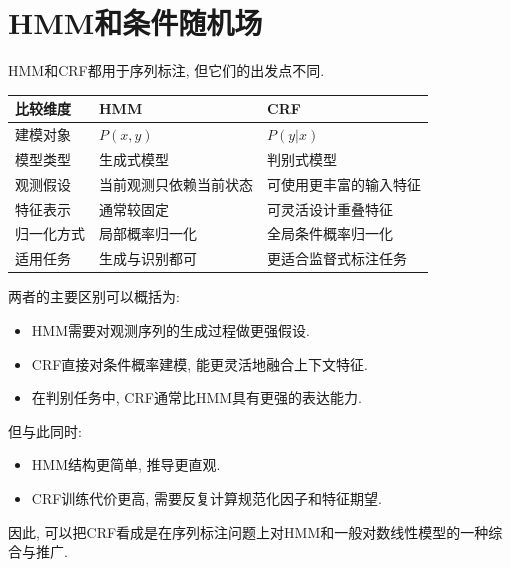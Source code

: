 \section{HMM和条件随机场}


HMM和CRF都用于序列标注, 但它们的出发点不同.

\begin{table}[H]
\centering
\begingroup
\setlength{\tabcolsep}{2pt}
\small
\begin{tabular}{|p{}|p{}|p{}|}
\hline
比较维度 & HMM & CRF \\ \hline
建模对象 & $P(x, y)$ & $P(y|x)$ \\ \hline
模型类型 & 生成式模型 & 判别式模型 \\ \hline
观测假设 & 当前观测只依赖当前状态 & 可使用更丰富的输入特征 \\ \hline
特征表示 & 通常较固定 & 可灵活设计重叠特征 \\ \hline
归一化方式 & 局部概率归一化 & 全局条件概率归一化 \\ \hline
适用任务 & 生成与识别都可 & 更适合监督式标注任务 \\ \hline
\end{tabular}
\endgroup
\end{table}

两者的主要区别可以概括为:

\begin{itemize}
\item HMM需要对观测序列的生成过程做更强假设.
\item CRF直接对条件概率建模, 能更灵活地融合上下文特征.
\item 在判别任务中, CRF通常比HMM具有更强的表达能力.
\end{itemize}

但与此同时:

\begin{itemize}
\item HMM结构更简单, 推导更直观.
\item CRF训练代价更高, 需要反复计算规范化因子和特征期望.
\end{itemize}

因此, 可以把CRF看成是在序列标注问题上对HMM和一般对数线性模型的一种综合与推广.
